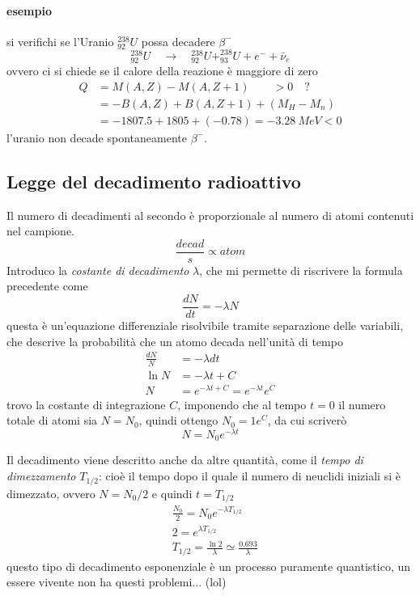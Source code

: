 \paragraph{esempio} si verifichi se l'Uranio $^{238}_{92}U$ possa decadere $\beta^-$
\begin{equation}
^{238}_{92}U \quad\longrightarrow\quad ^{238}_{92}U + ^{238}_{93}U + e^- + \bar\nu_e
\end{equation}
ovvero ci si chiede se il calore della reazione è maggiore di zero
\begin{equation}
\begin{split}
Q & = M(A,Z) - M(A,Z+1) \quad\quad > 0 \quad ? \\
& = -B(A,Z) + B(A,Z+1) + (M_H - M_n) \\
& = -1807.5 + 1805 + (-0.78) = - \SI{3.28}{MeV} < 0
\end{split}
\end{equation}
l'uranio non decade spontaneamente $\beta^-$.


\subsection{Legge del decadimento radioattivo}
Il numero di decadimenti al secondo è proporzionale al numero di atomi contenuti nel campione.
$$\frac{decad}{s} \propto atom$$
Introduco la \emph{costante di decadimento} $\lambda$, che mi permette di riscrivere la formula precedente come
\begin{equation}
\frac{dN}{dt} = - \lambda N
\end{equation}
questa è un'equazione differenziale risolvibile tramite separazione delle variabili, che descrive la probabilità che un atomo decada nell'unità di tempo
\begin{equation}
\begin{split}
\frac{dN}{N} & = - \lambda dt \\
\ln N & = -\lambda t + C \\
N & = e^{-\lambda t + C} = e^{-\lambda t } e^C 
\end{split}
\end{equation}
trovo la costante di integrazione $C$, imponendo che al tempo $t=0$ il numero totale di atomi sia $N=N_0$,
quindi ottengo $N_0 = 1 e^C$, da cui scriverò
\begin{equation}
N = N_0 e^{-\lambda t} 
\label{eq_decad}
\end{equation}

Il decadimento viene descritto anche da altre quantità, come il \emph{tempo di dimezzamento} $T_{1/2}$: cioè il tempo dopo il quale il numero di neuclidi iniziali si è dimezzato, ovvero $N = N_0 / 2$ e quindi $t= T_{1/2}$
\begin{equation}
\begin{split}
& \frac{N_0}{2} = N_0 e^{-\lambda T_{1/2}} \\
& 2 = e^{ \lambda T_{1/2} } \\
& T_{1/2} = \frac{\ln 2}{\lambda} \simeq \frac{0.693}{\lambda}
\end{split}
\end{equation}
questo tipo di decadimento esponenziale è un processo puramente quantistico, un essere vivente non ha questi problemi... (lol)

